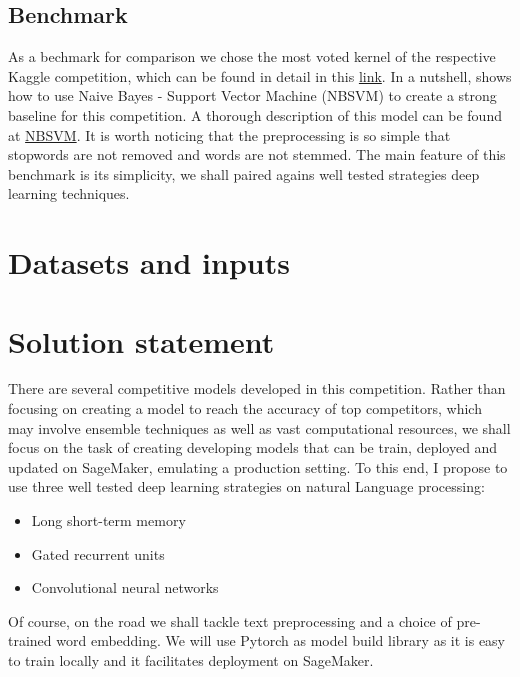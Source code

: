 \documentclass{report}
\begin{document}
\subsection{Benchmark}

As a bechmark for comparison we chose the most voted kernel of the respective 
Kaggle competition, which can be found in detail in this 
\href{https://www.kaggle.com/jhoward/nb-svm-strong-linear-baseline}{link}. In a nutshell, 
shows how to use Naive Bayes - Support Vector Machine (NBSVM) to create a strong baseline for this competition. 
A thorough description of this model can be found at \href{https://www.youtube.com/watch?v=37sFIak42Sc&feature=youtu.be&t=3745}{NBSVM}. It is worth noticing that the preprocessing is so
simple that stopwords are not removed and words are not stemmed. The main feature of this 
benchmark is its simplicity, we shall paired agains well tested strategies deep learning techniques.

\section{Datasets and inputs}

 

\section{Solution statement}

There are several competitive models developed in this competition. Rather than focusing 
on creating a model to reach the accuracy of top competitors, which may involve ensemble 
techniques as well as vast computational  resources, we shall focus on the task 
of creating developing models that can be train, deployed and updated on SageMaker,
emulating a production setting. To this end, 
I propose to use three well tested deep learning strategies on natural Language processing:

\begin{itemize}
\item Long short-term memory
\item Gated recurrent units
\item Convolutional neural networks
\end{itemize}
 
Of course, on the road we shall tackle text preprocessing and a choice of
pre-trained word embedding. We will use Pytorch as model build library as 
it is easy to train locally and it facilitates deployment on SageMaker.
 
\end{document}
